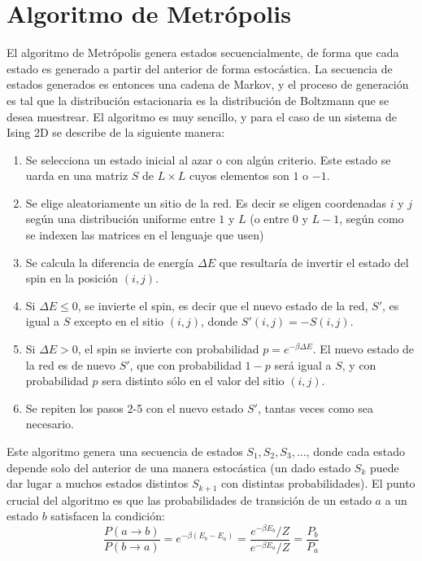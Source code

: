 \documentclass[a4paper,11pt,oneside]{article}
\begin{document}
\section{Algoritmo de Metrópolis}

El algoritmo de Metrópolis genera estados secuencialmente, de forma que cada
estado es generado a partir del anterior de forma estocástica. La secuencia de
estados generados es entonces una cadena de Markov, y el proceso de generación
es tal que la distribución estacionaria es la distribución de Boltzmann que se
desea muestrear. El algoritmo es muy sencillo, y para el caso de un sistema de
Ising 2D se describe de la siguiente manera:
\begin{enumerate}
\item Se selecciona un estado inicial al azar o con algún criterio. Este estado
    se uarda en una matriz $S$ de $L\times L$ cuyos elementos son $1$ o $-1$.
\item Se elige aleatoriamente un sitio de la red. Es decir se eligen
    coordenadas $i$ y $j$ según una distribución uniforme entre $1$ y $L$ (o
    entre $0$ y $L-1$, según como se indexen las matrices en el lenguaje que
    usen)
\item Se calcula la diferencia de energía $\Delta E$ que resultaría de invertir
    el estado del spin en la posición $(i,j)$.
\item Si $\Delta E \leq 0$, se invierte el spin, es decir que el nuevo estado
    de la red, $S'$, es igual a $S$ excepto en el sitio $(i,j)$,
    donde $S'(i,j) = -S(i,j)$.
\item Si $\Delta E >0$, el spin se invierte con probabilidad $p = e^{-\beta\Delta
    E}$. El nuevo estado de la red es de nuevo $S'$, que con probabilidad
    $1-p$ será igual a $S$, y con probabilidad $p$ sera distinto sólo en el
    valor del sitio $(i,j)$.
\item Se repiten los pasos 2-5 con el nuevo estado $S'$, tantas veces como sea
    necesario.
\end{enumerate}
Este algoritmo genera una secuencia de estados $S_1,S_2,S_3,\dots$, donde cada
estado depende solo del anterior de una manera estocástica (un dado estado
$S_k$ puede dar lugar a muchos estados distintos $S_{k+1}$ con distintas probabilidades).
El punto crucial del algoritmo es que las probabilidades de transición de un
estado $a$ a un estado $b$ satisfacen la condición:
\begin{equation}
    \frac{P(a\to b)}{P(b\to a)} = e^{-\beta(E_b-E_a)} = \frac{e^{-\beta
    E_b}/Z}{e^{-\beta E_a}/Z} = \frac{P_b}{P_a}
    \label{eq:bal_detallado}
\end{equation}
\end{document}
